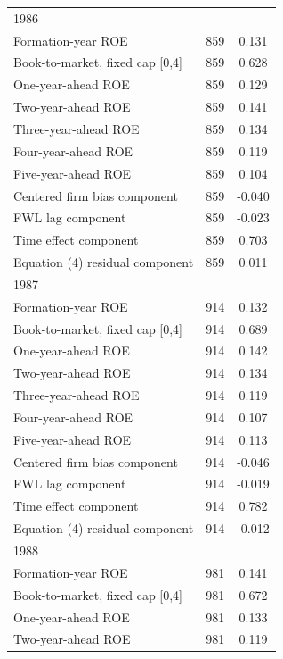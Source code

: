 {\begin{tabular}{l*{1}{cc}}
\hline
1986                &            &            \\
Formation-year ROE  &         859&       0.131\\
Book-to-market, fixed cap [0,4]&         859&       0.628\\
One-year-ahead ROE  &         859&       0.129\\
Two-year-ahead ROE  &         859&       0.141\\
Three-year-ahead ROE&         859&       0.134\\
Four-year-ahead ROE &         859&       0.119\\
Five-year-ahead ROE &         859&       0.104\\
Centered firm bias component&         859&      -0.040\\
FWL lag component   &         859&      -0.023\\
Time effect component&         859&       0.703\\
Equation (4) residual component&         859&       0.011\\
\hline
1987                &            &            \\
Formation-year ROE  &         914&       0.132\\
Book-to-market, fixed cap [0,4]&         914&       0.689\\
One-year-ahead ROE  &         914&       0.142\\
Two-year-ahead ROE  &         914&       0.134\\
Three-year-ahead ROE&         914&       0.119\\
Four-year-ahead ROE &         914&       0.107\\
Five-year-ahead ROE &         914&       0.113\\
Centered firm bias component&         914&      -0.046\\
FWL lag component   &         914&      -0.019\\
Time effect component&         914&       0.782\\
Equation (4) residual component&         914&      -0.012\\
\hline
1988                &            &            \\
Formation-year ROE  &         981&       0.141\\
Book-to-market, fixed cap [0,4]&         981&       0.672\\
One-year-ahead ROE  &         981&       0.133\\
Two-year-ahead ROE  &         981&       0.119\\

\end{tabular}}
